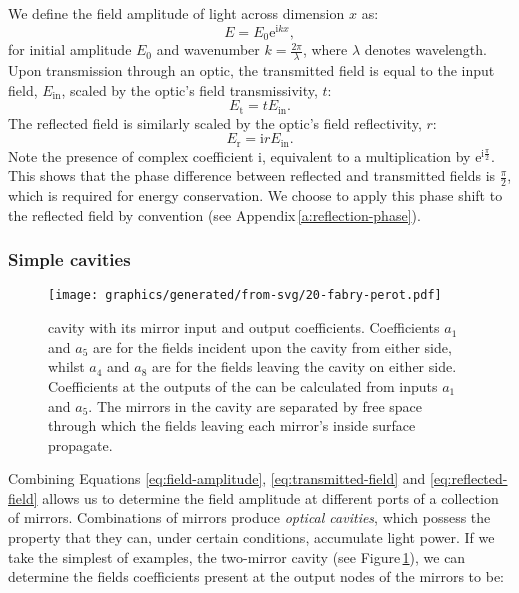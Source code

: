 We define the field amplitude of light across dimension $x$ as:
\begin{equation}
  \label{eq:field-amplitude}
  E = E_0 \text{e}^{\text{i} kx},
\end{equation}
for initial amplitude $E_0$ and wavenumber $k = \frac{2 \pi}{\lambda}$, where $\lambda$ denotes wavelength. Upon transmission through an optic, the transmitted field is equal to the input field, $E_{\text{in}}$, scaled by the optic's field transmissivity, $t$:
\begin{equation}
  \label{eq:transmitted-field}
  E_{\text{t}} = tE_{\text{in}}.
\end{equation}
The reflected field is similarly scaled by the optic's field reflectivity, $r$:
\begin{equation}
  \label{eq:reflected-field}
  E_{\text{r}} = \text{i}rE_{\text{in}}.
\end{equation}
Note the presence of complex coefficient $\text{i}$, equivalent to a multiplication by $\text{e}^{\text{i} \frac{\pi}{2}}$. This shows that the phase difference between reflected and transmitted fields is $\frac{\pi}{2}$, which is required for energy conservation. We choose to apply this phase shift to the reflected field by convention (see Appendix\,\ref{a:reflection-phase}).

\subsubsection{Simple cavities}

\begin{figure}
  \centering
  \texttt{[image: graphics/generated/from-svg/20-fabry-perot.pdf]}
  \caption{\label{fig:fabry-perot}\FP{} cavity with its mirror input and output coefficients. Coefficients $a_1$ and $a_5$ are for the fields incident upon the cavity from either side, whilst $a_4$ and $a_8$ are for the fields leaving the cavity on either side. Coefficients at the outputs of the \FP{} can be calculated from inputs $a_1$ and $a_5$. The mirrors in the cavity are separated by free space through which the fields leaving each mirror's inside surface propagate.}
\end{figure}

Combining Equations \ref{eq:field-amplitude}, \ref{eq:transmitted-field} and \ref{eq:reflected-field} allows us to determine the field amplitude at different ports of a collection of mirrors. Combinations of mirrors produce \emph{optical cavities}, which possess the property that they can, under certain conditions, accumulate light power. If we take the simplest of examples, the two-mirror \FP{} cavity (see Figure\,\ref{fig:fabry-perot}), we can determine the fields coefficients present at the output nodes of the mirrors to be:

